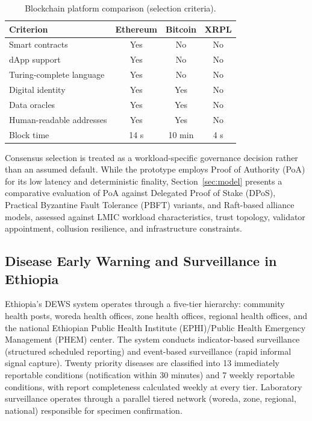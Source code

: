 \begin{table}[!ht]
\caption{Blockchain platform comparison (selection criteria).}\label{tab:platform}
\begin{tabular*}{\columnwidth}{@{\extracolsep\fill}lccc@{}}
\toprule
Criterion & Ethereum & Bitcoin & XRPL \\
\midrule
Smart contracts & Yes & No & No \\
dApp support & Yes & No & No \\
Turing-complete language & Yes & No & No \\
Digital identity & Yes & Yes & No \\
Data oracles & Yes & Yes & No \\
Human-readable addresses & Yes & Yes & No \\
Block time & 14 s & 10 min & 4 s \\
\bottomrule
\end{tabular*}
\end{table}

Consensus selection is treated as a workload-specific governance decision rather than an assumed default. While the prototype employs Proof of Authority (PoA) for its low latency and deterministic finality, Section~\ref{sec:model} presents a comparative evaluation of PoA against Delegated Proof of Stake (DPoS), Practical Byzantine Fault Tolerance (PBFT) variants, and Raft-based alliance models, assessed against LMIC workload characteristics, trust topology, validator appointment, collusion resilience, and infrastructure constraints.

\subsection{Disease Early Warning and Surveillance in Ethiopia}\label{subsec:dews}

Ethiopia's DEWS system operates through a five-tier hierarchy: community health posts, woreda health offices, zone health offices, regional health offices, and the national Ethiopian Public Health Institute (EPHI)/Public Health Emergency Management (PHEM) center. The system conducts indicator-based surveillance (structured scheduled reporting) and event-based surveillance (rapid informal signal capture). Twenty priority diseases are classified into 13 immediately reportable conditions (notification within 30 minutes) and 7 weekly reportable conditions, with report completeness calculated weekly at every tier. Laboratory surveillance operates through a parallel tiered network (woreda, zone, regional, national) responsible for specimen confirmation.

